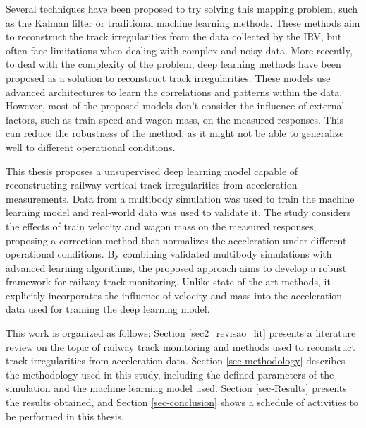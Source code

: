 Several techniques have been proposed to try solving this mapping problem, such as the Kalman filter or traditional machine learning methods. These methods aim to reconstruct the track irregularities from the data collected by the IRV, but often face limitations when dealing with complex and noisy data. More recently, to deal with the complexity of the problem, deep learning methods have been proposed as a solution to reconstruct track irregularities. These models use advanced architectures to learn the correlations and patterns within the data. However, most of the proposed models don't consider the influence of external factors, such as train speed and wagon mass, on the measured responses. This can reduce the robustness of the method, as it might not be able to generalize well to different operational conditions.

This thesis proposes a unsupervised deep learning model capable of reconstructing railway vertical track irregularities from acceleration measurements. Data from a multibody simulation was used to train the machine learning model and real-world data was used to validate it. The study considers the effects of train velocity and wagon mass on the measured responses, proposing a correction method that normalizes the acceleration under different operational conditions. By combining validated multibody simulations with advanced learning algorithms, the proposed approach aims to develop a robust framework for railway track monitoring. Unlike state-of-the-art methods, it explicitly incorporates the influence of velocity and mass into the acceleration data used for training the deep learning model.

This work is organized as follows: Section \ref{sec2_revisao_lit} presents a literature review on the topic of railway track monitoring and methods used to reconstruct track irregularities from acceleration data. Section \ref{sec-methodology} describes the methodology used in this study, including the defined parameters of the simulation and the machine learning model used. Section \ref{sec-Results} presents the results obtained, and Section \ref{sec-conclusion} shows a schedule of activities to be performed in this thesis.
